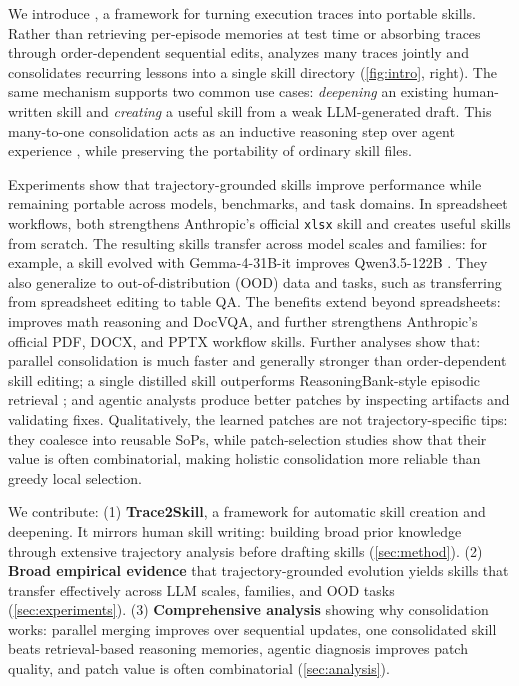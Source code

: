 We introduce \systemname{}, a framework for turning execution traces into portable skills.
Rather than retrieving per-episode memories at test time or absorbing traces through order-dependent sequential edits, \systemname{} analyzes many traces jointly and consolidates recurring lessons into a single skill directory (\cref{fig:intro}, right).
The same mechanism supports two common use cases: \emph{deepening} an existing human-written skill and \emph{creating} a useful skill from a weak LLM-generated draft.
This many-to-one consolidation acts as an inductive reasoning step over agent experience \citep{xiong-etal-2025-co,li2025mirageevaluatingexplaininginductive,lin2025llmbasedscientificinductivereasoning}, while preserving the portability of ordinary skill files.

Experiments show that trajectory-grounded skills improve performance while remaining portable across models, benchmarks, and task domains.
In spreadsheet workflows, \systemname{} both strengthens Anthropic's official \texttt{xlsx} skill and creates useful skills from scratch.
The resulting skills transfer across model scales and families: for example, a skill evolved with Gemma-4-31B-it \citep{gemma42026} improves Qwen3.5-122B \citep{qwen35blog}.
They also generalize to out-of-distribution (OOD) data and tasks, such as transferring from spreadsheet editing to table QA.
The benefits extend beyond spreadsheets: \systemname{} improves math reasoning and DocVQA, and further strengthens Anthropic's official PDF, DOCX, and PPTX workflow skills.
Further analyses show that:
parallel consolidation is much faster and generally stronger than order-dependent skill editing; a single distilled skill outperforms ReasoningBank-style episodic retrieval \citep{ouyang2026reasoningbankscalingagentselfevolving}; and agentic analysts produce better patches by inspecting artifacts and validating fixes.
Qualitatively, the learned patches are not trajectory-specific tips: they coalesce into reusable SoPs, while patch-selection studies show that their value is often combinatorial, making holistic consolidation more reliable than greedy local selection. 

We contribute: (1) \textbf{Trace2Skill}, a framework for automatic skill creation and deepening. It mirrors human skill writing: building broad prior knowledge through extensive trajectory analysis before drafting skills (\cref{sec:method}). (2) \textbf{Broad empirical evidence} that trajectory-grounded evolution yields skills that transfer effectively across LLM scales, families, and OOD tasks (\cref{sec:experiments}). (3) \textbf{Comprehensive analysis} showing why consolidation works: parallel merging improves over sequential updates, one consolidated skill beats retrieval-based reasoning memories, agentic diagnosis improves patch quality, and patch value is often combinatorial (\cref{sec:analysis}).

